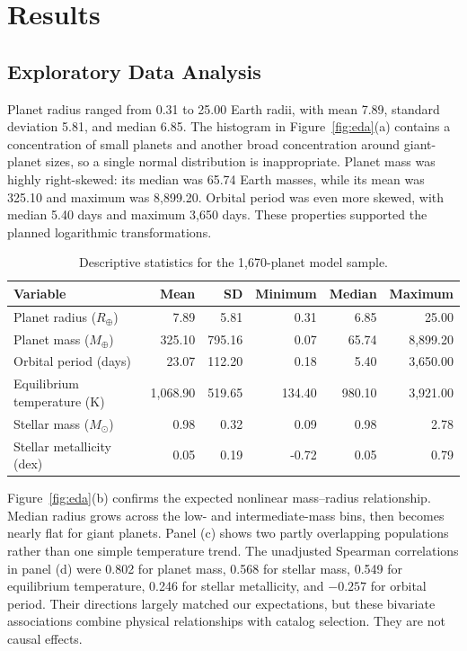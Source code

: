 \documentclass[11pt,a4paper]{article}
\begin{document}
\section{Results}

\subsection{Exploratory Data Analysis}

Planet radius ranged from 0.31 to 25.00 Earth radii, with mean 7.89, standard deviation 5.81, and median 6.85. The histogram in Figure~\ref{fig:eda}(a) contains a concentration of small planets and another broad concentration around giant-planet sizes, so a single normal distribution is inappropriate. Planet mass was highly right-skewed: its median was 65.74 Earth masses, while its mean was 325.10 and maximum was 8,899.20. Orbital period was even more skewed, with median 5.40 days and maximum 3,650 days. These properties supported the planned logarithmic transformations.

\begin{table}[tbp]
  \centering
  \small
  \begin{tabular}{lrrrrr}
    \toprule
    Variable & Mean & SD & Minimum & Median & Maximum \\
    \midrule
    Planet radius ($R_\oplus$) & 7.89 & 5.81 & 0.31 & 6.85 & 25.00 \\
    Planet mass ($M_\oplus$) & 325.10 & 795.16 & 0.07 & 65.74 & 8,899.20 \\
    Orbital period (days) & 23.07 & 112.20 & 0.18 & 5.40 & 3,650.00 \\
    Equilibrium temperature (K) & 1,068.90 & 519.65 & 134.40 & 980.10 & 3,921.00 \\
    Stellar mass ($M_\odot$) & 0.98 & 0.32 & 0.09 & 0.98 & 2.78 \\
    Stellar metallicity (dex) & 0.05 & 0.19 & -0.72 & 0.05 & 0.79 \\
    \bottomrule
  \end{tabular}
  \caption{Descriptive statistics for the 1,670-planet model sample.}
  \label{tab:descriptive}
\end{table}

Figure~\ref{fig:eda}(b) confirms the expected nonlinear mass--radius relationship. Median radius grows across the low- and intermediate-mass bins, then becomes nearly flat for giant planets. Panel (c) shows two partly overlapping populations rather than one simple temperature trend. The unadjusted Spearman correlations in panel (d) were 0.802 for planet mass, 0.568 for stellar mass, 0.549 for equilibrium temperature, 0.246 for stellar metallicity, and $-0.257$ for orbital period. Their directions largely matched our expectations, but these bivariate associations combine physical relationships with catalog selection. They are not causal effects.
\end{document}

